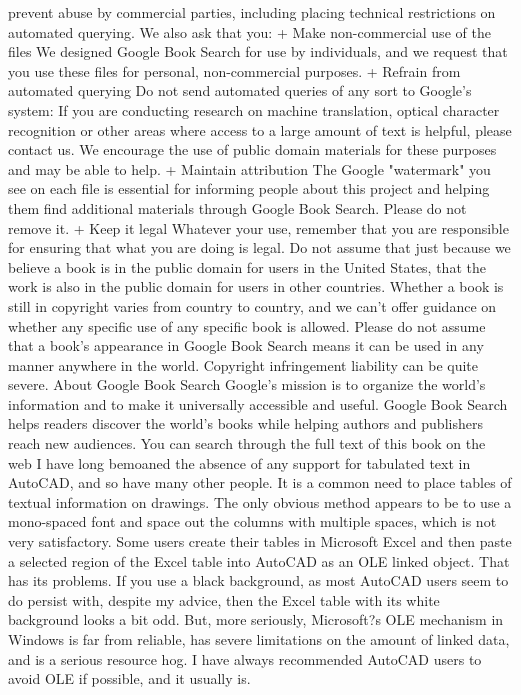 \documentclass[a4paper]{article}
\begin{document}
prevent abuse by commercial parties, including placing technical restrictions on automated querying. 
We also ask that you: 
+ Make non-commercial use of the files We designed Google Book Search for use by individuals, and we request that you use these files for 
personal, non-commercial purposes. 
+ Refrain from automated querying Do not send automated queries of any sort to Google's system: If you are conducting research on machine 
translation, optical character recognition or other areas where access to a large amount of text is helpful, please contact us. We encourage the 
use of public domain materials for these purposes and may be able to help. 
+ Maintain attribution The Google "watermark" you see on each file is essential for informing people about this project and helping them find 
additional materials through Google Book Search. Please do not remove it. 
+ Keep it legal Whatever your use, remember that you are responsible for ensuring that what you are doing is legal. Do not assume that just 
because we believe a book is in the public domain for users in the United States, that the work is also in the public domain for users in other 
countries. Whether a book is still in copyright varies from country to country, and we can't offer guidance on whether any specific use of 
any specific book is allowed. Please do not assume that a book's appearance in Google Book Search means it can be used in any manner 
anywhere in the world. Copyright infringement liability can be quite severe. 
About Google Book Search 
Google's mission is to organize the world's information and to make it universally accessible and useful. Google Book Search helps readers 
discover the world's books while helping authors and publishers reach new audiences. You can search through the full text of this book on the web 
I have long bemoaned the absence of any support for tabulated text in AutoCAD, and so have many other people. It is a common need to place tables of textual information on drawings. The only obvious method appears to be to use a mono-spaced font and space out the columns with multiple spaces, which is not very satisfactory.
Some users create their tables in Microsoft Excel and then paste a selected region of the Excel table into AutoCAD as an OLE linked object. That has its problems. If you use a black background, as most AutoCAD users seem to do persist with, despite my advice, then the Excel table with its white background looks a bit odd. But, more seriously, Microsoft?s OLE mechanism in Windows is far from reliable, has severe limitations on the amount of linked data, and is a serious resource hog. I have always recommended AutoCAD users to avoid OLE if possible, and it usually is.
\end{document}
